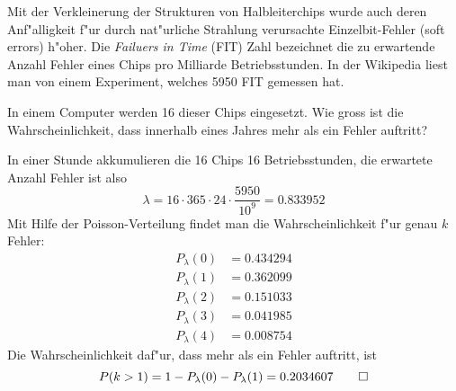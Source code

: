 Mit der Verkleinerung der Strukturen von Halbleiterchips wurde auch deren
Anf"alligkeit f"ur durch nat"urliche Strahlung verursachte Einzelbit-Fehler
(soft errors)
h"oher.
Die {\em Failuers in Time} (FIT) Zahl bezeichnet die zu erwartende Anzahl
Fehler eines Chips pro Milliarde Betriebsstunden.
In der Wikipedia liest man von einem Experiment, welches 5950 FIT
gemessen hat.

In einem Computer werden 16 dieser Chips eingesetzt.
Wie gross ist die Wahrscheinlichkeit, dass innerhalb eines
Jahres mehr als ein Fehler auftritt?

\begin{loesung}
In einer Stunde akkumulieren die 16 Chips 16 Betriebsstunden, die erwartete
Anzahl Fehler ist also
\[
\lambda = 16\cdot365\cdot 24 \cdot \frac{5950}{10^{9}}=0.833952
\]
Mit Hilfe der Poisson-Verteilung findet man die Wahrscheinlichkeit f"ur
genau $k$ Fehler:
\begin{align*}
P_{\lambda}(0)&=0.434294\\
P_{\lambda}(1)&=0.362099\\
P_{\lambda}(2)&=0.151033\\
P_{\lambda}(3)&=0.041985\\
P_{\lambda}(4)&=0.008754
\end{align*}
Die Wahrscheinlichkeit daf"ur, dass mehr als ein Fehler auftritt, ist
\[
P(k > 1)=1-P_\lambda(0)-P_\lambda(1)=0.2034607
\qedhere
\]
\end{loesung}


